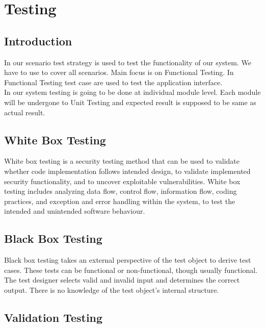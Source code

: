\chapter{Testing}


\section{Introduction}
In our scenario test strategy is used to test the functionality of our system. We have to use to cover all scenarios. Main focus is on Functional Testing. In Functional Testing test case are used to test the application interface.\\
In our system testing is going to be done at individual module level. Each module will be undergone to Unit Testing and expected result is supposed to be same as actual result.\\


\section{White Box Testing}
White box testing is a security testing method that can be used to validate whether code implementation follows intended design, to validate implemented security functionality, and to uncover exploitable vulnerabilities. White box testing includes analyzing data flow, control flow, information flow, coding practices, and exception and error handling within the system, to test the intended and unintended software
behaviour.\\



\section{Black Box Testing}
Black box testing takes an external perspective of the test object to derive test cases. These tests can be functional or non-functional, though usually functional. The test designer selects valid and invalid input and determines the correct output. There is no knowledge of the test object’s internal structure.\\





\section{Validation Testing}
